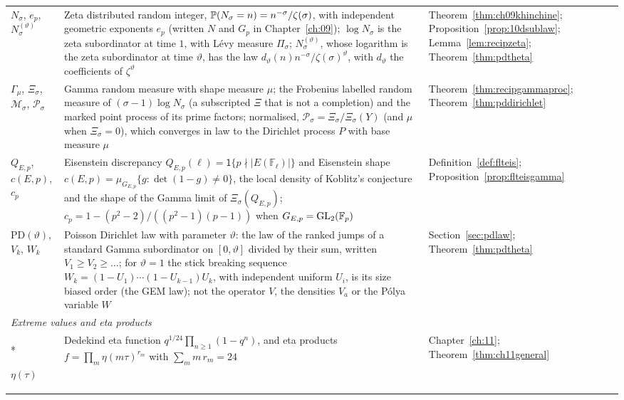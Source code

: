 {\begin{longtable}{p{0.8in}p{2.65in}p{0.95in}}
\raggedright $N_\sigma$, $e_p$, $N^{(\vartheta)}_\sigma$ & \raggedright Zeta distributed random integer, $\mathbb{P}(N_\sigma=n)=n^{-\sigma}/\zeta(\sigma)$, with independent geometric exponents $e_p$ (written $N$ and $G_p$ in Chapter~\ref{ch:09}); $\log N_\sigma$ is the zeta subordinator at time $1$, with L\'evy measure $\Pi_\sigma$; $N^{(\vartheta)}_\sigma$, whose logarithm is the zeta subordinator at time $\vartheta$, has the law $d_\vartheta(n)n^{-\sigma}/\zeta(\sigma)^\vartheta$, with $d_\vartheta$ the coefficients of $\zeta^\vartheta$ & \raggedright Theorem~\ref{thm:ch09khinchine}; Proposition~\ref{prop:10dsublaw}; Lemma~\ref{lem:recipzeta}; Theorem~\ref{thm:pdtheta}\tabularnewline[1pt]
\raggedright $\Gamma_\mu$, $\Xi_\sigma$, $\mathcal M_\sigma$, $\mathcal P_\sigma$ & \raggedright Gamma random measure with shape measure $\mu$; the Frobenius labelled random measure of $(\sigma-1)\log N_\sigma$ (a subscripted $\Xi$ that is not a completion) and the marked point process of its prime factors; normalised, $\mathcal P_\sigma=\Xi_\sigma/\Xi_\sigma(Y)$ (and $\mu$ when $\Xi_\sigma=0$), which converges in law to the Dirichlet process $P$ with base measure $\mu$ & \raggedright Theorem~\ref{thm:recipgammaproc}; Theorem~\ref{thm:pddirichlet}\tabularnewline[1pt]
\raggedright $Q_{E,p}$, $c(E,p)$, $c_p$ & \raggedright Eisenstein discrepancy $Q_{E,p}(\ell)=\mathsf 1\{p\nmid|E(\mathbb F_\ell)|\}$ and Eisenstein shape $c(E,p)=\mu_{G_{E,p}}\{g:\det(1-g)\ne0\}$, the local density of Koblitz's conjecture and the shape of the Gamma limit of $\Xi_\sigma(Q_{E,p})$; $c_p=1-(p^2-2)/((p^2-1)(p-1))$ when $G_{E,p}=\mathrm{GL}_2(\mathbb F_p)$ & \raggedright Definition~\ref{def:flteis}; Proposition~\ref{prop:flteisgamma}\tabularnewline[1pt]
\raggedright $\mathrm{PD}(\vartheta)$, $V_k$, $W_k$ & \raggedright Poisson Dirichlet law with parameter $\vartheta$: the law of the ranked jumps of a standard Gamma subordinator on $[0,\vartheta]$ divided by their sum, written $V_1\ge V_2\ge\dots$; for $\vartheta=1$ the stick breaking sequence $W_k=(1-U_1)\cdots(1-U_{k-1})U_k$, with independent uniform $U_i$, is its size biased order (the GEM law); not the operator $V$, the densities $V_a$ or the P\'olya variable $W$ & \raggedright Section~\ref{sec:pdlaw}; Theorem~\ref{thm:pdtheta}\tabularnewline[1pt]
\midrule
\multicolumn{3}{l}{\textit{Extreme values and eta products}}\\*
\raggedright $\eta(\tau)$ & \raggedright Dedekind eta function $q^{1/24}\prod_{n\ge1}(1-q^n)$, and eta products $f=\prod_m\eta(m\tau)^{r_m}$ with $\sum_mm\,r_m=24$ & \raggedright Chapter~\ref{ch:11}; Theorem~\ref{thm:ch11general}\tabularnewline[1pt]

\end{longtable}}

